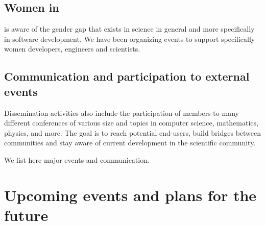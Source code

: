 \documentclass{deliverablereport}
\begin{document}
\subsection{Women in \ODK}

\ODK is aware of the gender gap that exists in science in general
and more specifically in software development. We have been organizing
events to support specifically women developers, engineers and scientists.









\subsection{Communication and participation to external events}

Dissemination activities also include the participation of \ODK
members to many different conferences of various size and topics
in computer science, mathematics, physics, and more. The goal is
to reach potential end-users, build bridges between communities and stay aware 
of current development in the scientific community.

We list here major events and communication. 
























\section{Upcoming events and plans for the future}
\end{document}
